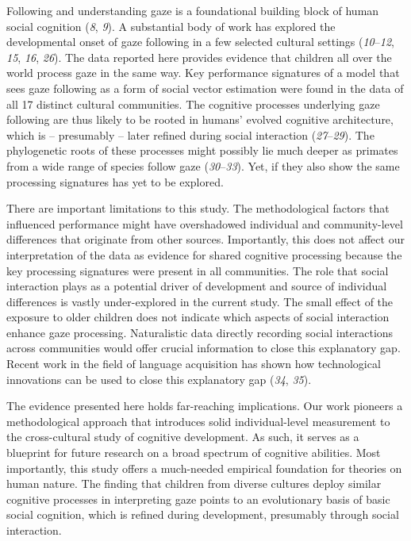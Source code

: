 \documentclass[
  man,floatsintext]{apa6}
\begin{document}
Following and understanding gaze is a foundational building block of human social cognition (\emph{8}, \emph{9}). A substantial body of work has explored the developmental onset of gaze following in a few selected cultural settings (\emph{10}--\emph{12}, \emph{15}, \emph{16}, \emph{26}). The data reported here provides evidence that children all over the world process gaze in the same way. Key performance signatures of a model that sees gaze following as a form of social vector estimation were found in the data of all 17 distinct cultural communities. The cognitive processes underlying gaze following are thus likely to be rooted in humans' evolved cognitive architecture, which is -- presumably -- later refined during social interaction (\emph{27}--\emph{29}). The phylogenetic roots of these processes might possibly lie much deeper as primates from a wide range of species follow gaze (\emph{30}--\emph{33}). Yet, if they also show the same processing signatures has yet to be explored.

There are important limitations to this study. The methodological factors that influenced performance might have overshadowed individual and community-level differences that originate from other sources. Importantly, this does not affect our interpretation of the data as evidence for shared cognitive processing because the key processing signatures were present in all communities. The role that social interaction plays as a potential driver of development and source of individual differences is vastly under-explored in the current study. The small effect of the exposure to older children does not indicate which aspects of social interaction enhance gaze processing. Naturalistic data directly recording social interactions across communities would offer crucial information to close this explanatory gap. Recent work in the field of language acquisition has shown how technological innovations can be used to close this explanatory gap (\emph{34}, \emph{35}).

The evidence presented here holds far-reaching implications. Our work pioneers a methodological approach that introduces solid individual-level measurement to the cross-cultural study of cognitive development. As such, it serves as a blueprint for future research on a broad spectrum of cognitive abilities. Most importantly, this study offers a much-needed empirical foundation for theories on human nature. The finding that children from diverse cultures deploy similar cognitive processes in interpreting gaze points to an evolutionary basis of basic social cognition, which is refined during development, presumably through social interaction.
\end{document}
